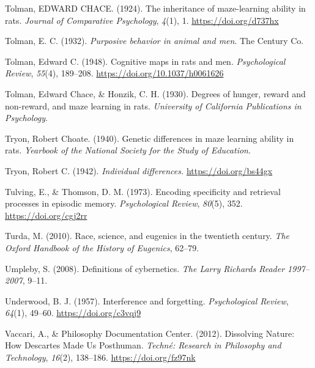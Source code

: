 \documentclass[
  oneside,
  12pt]{crumpbook}
\newlength{\cslhangindent}
\newlength{\cslentryspacingunit} %
\newenvironment{CSLReferences}[2] %
 {%
  \setlength{\parindent}{0pt}
  \ifodd #1
  \let\oldpar\par
  \def\par{\hangindent=\cslhangindent\oldpar}
  \fi
  \setlength{\parskip}{#2\cslentryspacingunit}
 }%
 {}
\begin{document}
\begin{CSLReferences}{1}{0}
\leavevmode{}%
Tolman, EDWARD CHACE. (1924). The inheritance of maze-learning ability in rats. \emph{Journal of Comparative Psychology}, \emph{4}(1), 1. \url{https://doi.org/d737hx}

\leavevmode{}%
Tolman, E. C. (1932). \emph{Purposive behavior in animal and men}. {The Century Co.}

\leavevmode{}%
Tolman, Edward C. (1948). Cognitive maps in rats and men. \emph{Psychological Review}, \emph{55}(4), 189--208. \url{https://doi.org/10.1037/h0061626}

\leavevmode{}%
Tolman, Edward Chace, \& Honzik, C. H. (1930). Degrees of hunger, reward and non-reward, and maze learning in rats. \emph{University of California Publications in Psychology}.

\leavevmode{}%
Tryon, Robert Choate. (1940). Genetic differences in maze learning ability in rats. \emph{Yearbook of the National Society for the Study of Education}.

\leavevmode{}%
Tryon, Robert C. (1942). \emph{Individual differences.} \url{https://doi.org/bs44gx}

\leavevmode{}%
Tulving, E., \& Thomson, D. M. (1973). Encoding specificity and retrieval processes in episodic memory. \emph{Psychological Review}, \emph{80}(5), 352. \url{https://doi.org/cgj2rr}

\leavevmode{}%
Turda, M. (2010). Race, science, and eugenics in the twentieth century. \emph{The Oxford Handbook of the History of Eugenics}, 62--79.

\leavevmode{}%
Umpleby, S. (2008). Definitions of cybernetics. \emph{The Larry Richards Reader 1997--2007}, 9--11.

\leavevmode{}%
Underwood, B. J. (1957). Interference and forgetting. \emph{Psychological Review}, \emph{64}(1), 49--60. \url{https://doi.org/c3vqj9}

\leavevmode{}%
Vaccari, A., \& Philosophy Documentation Center. (2012). Dissolving {Nature}: {How Descartes Made Us Posthuman}. \emph{Techné: Research in Philosophy and Technology}, \emph{16}(2), 138--186. \url{https://doi.org/fz97nk}


\end{CSLReferences}
\end{document}
